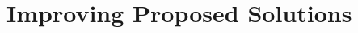 \documentclass[notheorems]{beamer}
\begin{document}
 









\section{Improving Proposed  Solutions}
\label{sec:algoforsoln}
\end{document}
